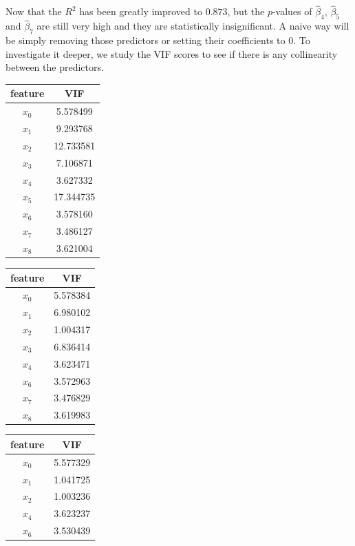 \documentclass{article}
\begin{document}
Now that the $R^2$ has been greatly improved to $0.873$, but the $p$-values of $\hat{\beta}_4$, $\hat{\beta}_5$ and $\hat{\beta}_7$ are still very high and they are statistically insignificant. A naive way will be simply removing those predictors or setting their coefficients to 0. To investigate it deeper, we study the VIF scores to see if there is any collinearity between the predictors. 


\begin{center}
\begin{table}
\hfill
\begin{tabular}{| c | c |}
\toprule
 feature &        VIF \\
\midrule
       $x_0$ &   5.578499 \\
       $x_1$ &   9.293768 \\
       $x_2$ &  12.733581 \\
       $x_3$ &   7.106871 \\
       $x_4$ &   3.627332 \\
       $x_5$ &  17.344735 \\
       $x_6$ &   3.578160 \\
       $x_7$ &   3.486127 \\
       $x_8$ &   3.621004 \\
\bottomrule
\end{tabular}
\hfill
\begin{tabular}{| c | c |}
\toprule
 feature &       VIF \\
\midrule
       $x_0$ &  5.578384 \\
       $x_1$ &  6.980102 \\
       $x_2$ &  1.004317 \\
       $x_3$ &  6.836414 \\
       $x_4$ &  3.623471 \\
       $x_6$ &  3.572963 \\
       $x_7$ &  3.476829 \\
       $x_8$ &  3.619983 \\
\bottomrule
\end{tabular}
\hfill
\begin{tabular}{| c | c |}
\toprule
 feature &       VIF \\
\midrule
       $x_0$ &  5.577329 \\
       $x_1$ &  1.041725 \\
       $x_2$ &  1.003236 \\
       $x_4$ &  3.623237 \\
       $x_6$ &  3.530439 \\

\end{tabular}
\end{table}
\end{center}
\end{document}

